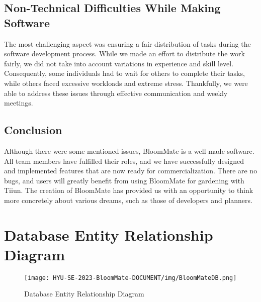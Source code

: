 \documentclass[conference, a4paper]{IEEEtran}
\begin{document}
\subsection{Non-Technical Difficulties While Making Software}
The most challenging aspect was ensuring a fair distribution of tasks during the software development process. While we made an effort to distribute the work fairly, we did not take into account variations in experience and skill level. Consequently, some individuals had to wait for others to complete their tasks, while others faced excessive workloads and extreme stress. Thankfully, we were able to address these issues through effective communication and weekly meetings. \\

\subsection{Conclusion}
Although there were some mentioned issues, BloomMate is a well-made software. All team members have fulfilled their roles, and we have successfully designed and implemented features that are now ready for commercialization. There are no bugs, and users will greatly benefit from using BloomMate for gardening with Tiiun. The creation of BloomMate has provided us with an opportunity to think more concretely about various dreams, such as those of developers and planners. \\


\onecolumn
\appendix
    \section{Database Entity Relationship Diagram}\label{app: Database Entity Relationship Diagram}
    \begin{figure}[h]
    \centering
    \texttt{[image: HYU-SE-2023-BloomMate-DOCUMENT/img/BloomMateDB.png]}
    \label{fig}
    \caption{Database Entity Relationship Diagram}
    \end{figure}

\twocolumn


\end{document}

